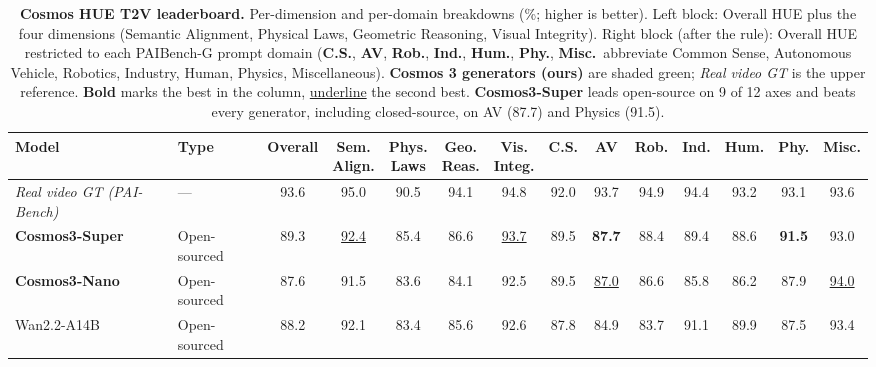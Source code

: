 \begin{table}[H]
  \centering
  \caption{\textbf{Cosmos HUE T2V leaderboard.} Per-dimension and per-domain breakdowns (\%; higher is better). Left block: Overall HUE plus the four dimensions (Semantic
Alignment, Physical Laws, Geometric Reasoning, Visual Integrity). Right block (after the rule): Overall HUE restricted to each PAIBench-G prompt domain (\textbf{C.S.}, \textbf{AV},
\textbf{Rob.}, \textbf{Ind.}, \textbf{Hum.}, \textbf{Phy.}, \textbf{Misc.}\ abbreviate Common Sense, Autonomous Vehicle, Robotics, Industry, Human, Physics, Miscellaneous).
\textcolor{nvidiagreen!60!black}{\textbf{Cosmos 3 generators (ours)}} are shaded green; \emph{Real video GT} is the upper reference. \textbf{Bold} marks the best in the column,
\underline{underline} the second best. \textbf{Cosmos3-Super} leads open-source on 9 of 12 axes and beats every generator, including closed-source, on AV (87.7) and Physics (91.5).}
  \label{tab:hue_t2v_leaderboard}
  \footnotesize
  \setlength{\tabcolsep}{3pt}
  \renewcommand{\arraystretch}{1.15}
  \begin{tabular}{l l c cccc | ccccccc}
      \toprule
      \textbf{Model} & \textbf{Type} & \textbf{Overall}
      & \makecell{\textbf{Sem.}\\\textbf{Align.}} & \makecell{\textbf{Phys.}\\\textbf{Laws}} & \makecell{\textbf{Geo.}\\\textbf{Reas.}} & \makecell{\textbf{Vis.}\\\textbf{Integ.}}
      & \textbf{C.S.} & \textbf{AV} & \textbf{Rob.} & \textbf{Ind.} & \textbf{Hum.} & \textbf{Phy.} & \textbf{Misc.} \\
      \midrule
      \rowcolor{black!8}
      \emph{Real video GT (PAI-Bench)} & --- & 93.6 & 95.0 & 90.5 & 94.1 & 94.8 & 92.0 & 93.7 & 94.9 & 94.4 & 93.2 & 93.1 & 93.6 \\
      \midrule
      \rowcolor{rowours}
      \textbf{Cosmos3-Super} & Open-sourced & 89.3 & \underline{92.4} & 85.4 & 86.6 & \underline{93.7} & 89.5 & \textbf{87.7} & 88.4 & 89.4 & 88.6 & \textbf{91.5} & 93.0 \\
      \rowcolor{rowours}
      \textbf{Cosmos3-Nano} & Open-sourced & 87.6 & 91.5 & 83.6 & 84.1 & 92.5 & 89.5 & \underline{87.0} & 86.6 & 85.8 & 86.2 & 87.9 & \underline{94.0} \\
      \midrule
      Wan2.2-A14B & Open-sourced & 88.2 & 92.1 & 83.4 & 85.6 & 92.6 & 87.8 & 84.9 & 83.7 & 91.1 & 89.9 & 87.5 & 93.4 \\

\end{tabular}
\end{table}
